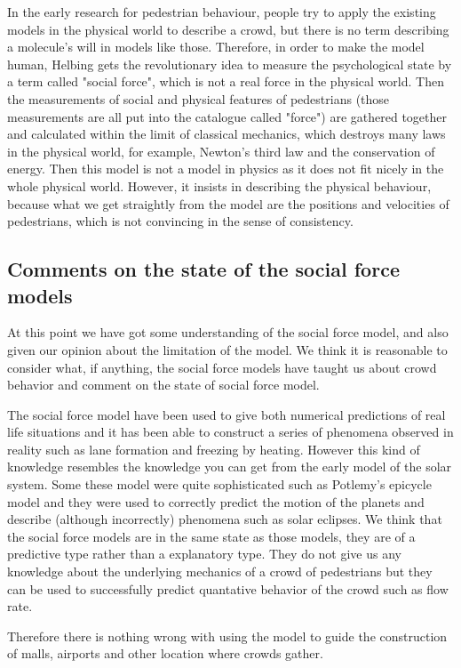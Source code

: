 In the early research for pedestrian behaviour, people try to apply the existing 
models in the physical world to describe a crowd, but there is no term describing 
a molecule's will in models like those. Therefore, in order to make the model 
human, Helbing gets the revolutionary idea to measure the psychological state 
by a term called "social force", which is not a real force in the physical world. 
\cite{social-force} Then the measurements of social and physical features 
of pedestrians (those measurements are all put into the catalogue called "force") 
are gathered together and calculated within the limit of classical mechanics, 
which destroys many laws in the physical world, for example, Newton's third law 
and the conservation of energy. Then this model is not a model in physics as 
it does not fit nicely in the whole physical world. However, it insists in describing 
the physical behaviour, because what we get straightly from the model are 
the positions and velocities of pedestrians, which is not convincing in the sense 
of consistency.

\subsection{Comments on the state of the social force models}
At this point we have got some understanding of the social force model, and 
also given our opinion about the limitation of the model. We think it is 
reasonable to consider what, if anything, the social force models have taught 
us about crowd behavior and comment on the state of social force model. 

The social force model have been used to give both numerical predictions of 
real life situations and it has been able to construct a series of phenomena 
observed in reality such as lane formation and freezing by heating.
However this kind of knowledge resembles the knowledge you can get from 
the early model of the solar system. Some these model were quite sophisticated 
such as Potlemy's epicycle model and they were used to correctly predict the 
motion of the planets and describe (although incorrectly) phenomena such as 
solar eclipses.
We think that the social force models are in the same state as those models, 
they are of a predictive type rather than a explanatory type. They do not give 
us any knowledge about the underlying mechanics of a crowd of pedestrians but 
they can be used to successfully predict quantative behavior of the crowd such 
as flow rate. 

Therefore there is nothing wrong with using the model to guide the construction 
of malls, airports and other location where crowds gather.

